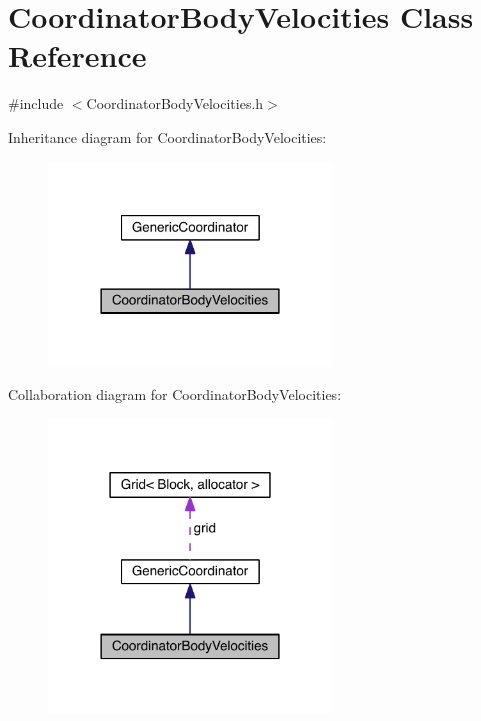 \hypertarget{class_coordinator_body_velocities}{}\section{Coordinator\+Body\+Velocities Class Reference}
\label{class_coordinator_body_velocities}


{\ttfamily \#include $<$Coordinator\+Body\+Velocities.\+h$>$}



Inheritance diagram for Coordinator\+Body\+Velocities\+:\nopagebreak
\begin{figure}[H]
\begin{center}
\leavevmode
\includegraphics[width=213pt]{dc/d0c/class_coordinator_body_velocities__inherit__graph}
\end{center}
\end{figure}


Collaboration diagram for Coordinator\+Body\+Velocities\+:\nopagebreak
\begin{figure}[H]
\begin{center}
\leavevmode
\includegraphics[width=213pt]{d4/d7e/class_coordinator_body_velocities__coll__graph}
\end{center}
\end{figure}
